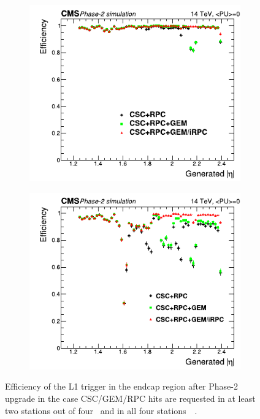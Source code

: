 	\begin{figure}[H]
		\begin{subfigure}{0.5\linewidth}
			\centering
			\includegraphics[width=\linewidth]{fig/chapt4/EMTF-eff-2of4.pdf}
			\caption{\label{fig:EMTF-eff:A}}
		\end{subfigure}
		\begin{subfigure}{0.5\linewidth}
			\centering
			\includegraphics[width=\linewidth]{fig/chapt4/EMTF-eff-4of4.pdf}
			\caption{\label{fig:EMTF-eff:B}}
		\end{subfigure}
		\caption{\label{fig:EMTF-eff} Efficiency of the L1 trigger in the endcap region after Phase-2 upgrade in the case CSC/GEM/RPC hits are requested in at least two stations out of four~ and in all four stations~~\cite{PHASEIITP}.}
	\end{figure}
	
